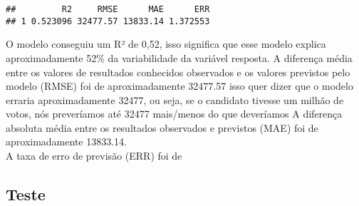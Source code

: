\documentclass[]{article}
\newenvironment{Shaded}{\begin{snugshade}}{\end{snugshade}}
\newcommand{\KeywordTok}[1]{\textcolor[rgb]{0.13,0.29,0.53}{\textbf{#1}}}
\newcommand{\DataTypeTok}[1]{\textcolor[rgb]{0.13,0.29,0.53}{#1}}
\newcommand{\StringTok}[1]{\textcolor[rgb]{0.31,0.60,0.02}{#1}}
\newcommand{\OperatorTok}[1]{\textcolor[rgb]{0.81,0.36,0.00}{\textbf{#1}}}
\newcommand{\NormalTok}[1]{#1}
\begin{document}
\begin{Shaded}
\end{Shaded}

\begin{verbatim}
##         R2     RMSE      MAE      ERR
## 1 0.523096 32477.57 13833.14 1.372553
\end{verbatim}

O modelo conseguiu um R² de 0,52, isso significa que esse modelo explica
aproximadamente 52\% da variabilidade da variável resposta. A diferença
média entre os valores de resultados conhecidos observados e os valores
previstos pelo modelo (RMSE) foi de aproximadamente 32477.57 isso quer
dizer que o modelo erraria aproximadamente 32477, ou seja, se o
candidato tivesse um milhão de votos, nós preveríamos até 32477
mais/menos do que deveríamos A diferença absoluta média entre os
resultados observados e previstos (MAE) foi de aproximadamente
13833.14.\\
A taxa de erro de previsão (ERR) foi de

\subsection{Teste}\label{teste}

\begin{Shaded}
\end{Shaded}
\end{document}

